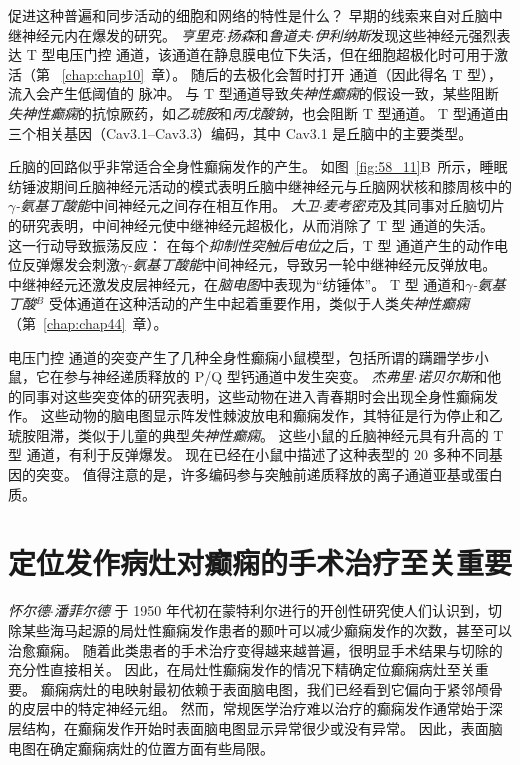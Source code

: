 促进这种普遍和同步活动的细胞和网络的特性是什么？
早期的线索来自对丘脑中继神经元内在爆发的研究。
\textit{亨里克$\cdot$扬森}和\textit{鲁道夫$\cdot$伊利纳斯}发现这些神经元强烈表达 T 型电压门控  通道，该通道在静息膜电位下失活，但在细胞超极化时可用于激活（第 ~\ref{chap:chap10}~章）。
随后的去极化会暂时打开  通道（因此得名 T 型）， 流入会产生低阈值的  脉冲。
与 T 型通道导致\textit{失神性癫痫}的假设一致，某些阻断\textit{失神性癫痫}的抗惊厥药，如\textit{乙琥胺}和\textit{丙戊酸钠}，也会阻断 T 型通道。
T 型通道由三个相关基因（Cav3.1–Cav3.3）编码，其中 Cav3.1 是丘脑中的主要类型。


丘脑的回路似乎非常适合全身性癫痫发作的产生。
如图~\ref{fig:58_11}B~所示，睡眠纺锤波期间丘脑神经元活动的模式表明丘脑中继神经元与丘脑网状核和膝周核中的\textit{$\gamma$-氨基丁酸能}中间神经元之间存在相互作用。
\textit{大卫$\cdot$麦考密克}及其同事对丘脑切片的研究表明，中间神经元使中继神经元超极化，从而消除了 T 型  通道的失活。
这一行动导致振荡反应：
在每个\textit{抑制性突触后电位}之后，T 型  通道产生的动作电位反弹爆发会刺激\textit{$\gamma$-氨基丁酸能}中间神经元，导致另一轮中继神经元反弹放电。
中继神经元还激发皮层神经元，在\textit{脑电图}中表现为“纺锤体”。
T 型  通道和\textit{$\gamma$-氨基丁酸}$^B$ 受体通道在这种活动的产生中起着重要作用，类似于人类\textit{失神性癫痫}（第~\ref{chap:chap44}~章）。


电压门控  通道的突变产生了几种全身性癫痫小鼠模型，包括所谓的蹒跚学步小鼠，它在参与神经递质释放的 P/Q 型钙通道中发生突变。
\textit{杰弗里$\cdot$诺贝尔斯}和他的同事对这些突变体的研究表明，这些动物在进入青春期时会出现全身性癫痫发作。
这些动物的脑电图显示阵发性棘波放电和癫痫发作，其特征是行为停止和乙琥胺阻滞，类似于儿童的典型\textit{失神性癫痫}。
这些小鼠的丘脑神经元具有升高的 T 型  通道，有利于反弹爆发。
现在已经在小鼠中描述了这种表型的 20 多种不同基因的突变。
值得注意的是，许多编码参与突触前递质释放的离子通道亚基或蛋白质。



\section{定位发作病灶对癫痫的手术治疗至关重要}

\textit{怀尔德$\cdot$潘菲尔德 }于 1950 年代初在蒙特利尔进行的开创性研究使人们认识到，切除某些海马起源的局灶性癫痫发作患者的颞叶可以减少癫痫发作的次数，甚至可以治愈癫痫。
随着此类患者的手术治疗变得越来越普遍，很明显手术结果与切除的充分性直接相关。
因此，在局灶性癫痫发作的情况下精确定位癫痫病灶至关重要。
癫痫病灶的电映射最初依赖于表面脑电图，我们已经看到它偏向于紧邻颅骨的皮层中的特定神经元组。
然而，常规医学治疗难以治疗的癫痫发作通常始于深层结构，在癫痫发作开始时表面脑电图显示异常很少或没有异常。
因此，表面脑电图在确定癫痫病灶的位置方面有些局限。



